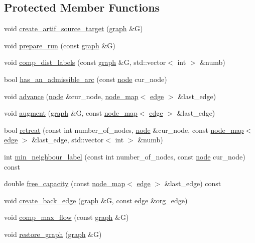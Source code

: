 \subsection*{Protected Member Functions}
\begin{DoxyCompactItemize}
\item 
void \mbox{\hyperlink{classmaxflow__sap_a617016b94a4924fb2574ab87c970d49c}{create\+\_\+artif\+\_\+source\+\_\+target}} (\mbox{\hyperlink{classgraph}{graph}} \&G)
\item 
void \mbox{\hyperlink{classmaxflow__sap_a4504b071456d536371ff6d07055e800d}{prepare\+\_\+run}} (const \mbox{\hyperlink{classgraph}{graph}} \&G)
\item 
void \mbox{\hyperlink{classmaxflow__sap_ab9a8d9e4e32a8eb6390c0d2fb3cb9596}{comp\+\_\+dist\+\_\+labels}} (const \mbox{\hyperlink{classgraph}{graph}} \&G, std\+::vector$<$ int $>$ \&numb)
\item 
bool \mbox{\hyperlink{classmaxflow__sap_a4fdfe2e37832ed2e522b5c972aa1ba5f}{has\+\_\+an\+\_\+admissible\+\_\+arc}} (const \mbox{\hyperlink{classnode}{node}} cur\+\_\+node)
\item 
void \mbox{\hyperlink{classmaxflow__sap_a0eb02b00fa0840cfad87eb6d67c9b849}{advance}} (\mbox{\hyperlink{classnode}{node}} \&cur\+\_\+node, \mbox{\hyperlink{classnode__map}{node\+\_\+map}}$<$ \mbox{\hyperlink{classedge}{edge}} $>$ \&last\+\_\+edge)
\item 
void \mbox{\hyperlink{classmaxflow__sap_a02f7814313a36b30bb99c40ead6c9ef5}{augment}} (\mbox{\hyperlink{classgraph}{graph}} \&G, const \mbox{\hyperlink{classnode__map}{node\+\_\+map}}$<$ \mbox{\hyperlink{classedge}{edge}} $>$ \&last\+\_\+edge)
\item 
bool \mbox{\hyperlink{classmaxflow__sap_a88a24204f44031d2332493474ee18f95}{retreat}} (const int number\+\_\+of\+\_\+nodes, \mbox{\hyperlink{classnode}{node}} \&cur\+\_\+node, const \mbox{\hyperlink{classnode__map}{node\+\_\+map}}$<$ \mbox{\hyperlink{classedge}{edge}} $>$ \&last\+\_\+edge, std\+::vector$<$ int $>$ \&numb)
\item 
int \mbox{\hyperlink{classmaxflow__sap_a7cf86463129a569f41883fdad6869fce}{min\+\_\+neighbour\+\_\+label}} (const int number\+\_\+of\+\_\+nodes, const \mbox{\hyperlink{classnode}{node}} cur\+\_\+node) const
\item 
double \mbox{\hyperlink{classmaxflow__sap_abd2935db387f32891228291a52d6ad45}{free\+\_\+capacity}} (const \mbox{\hyperlink{classnode__map}{node\+\_\+map}}$<$ \mbox{\hyperlink{classedge}{edge}} $>$ \&last\+\_\+edge) const
\item 
void \mbox{\hyperlink{classmaxflow__sap_a4278d120bdbc505abb176f5ca6ba02b3}{create\+\_\+back\+\_\+edge}} (\mbox{\hyperlink{classgraph}{graph}} \&G, const \mbox{\hyperlink{classedge}{edge}} \&org\+\_\+edge)
\item 
void \mbox{\hyperlink{classmaxflow__sap_ae5ff08e7b1c5fe5845a2ed584b04ca1b}{comp\+\_\+max\+\_\+flow}} (const \mbox{\hyperlink{classgraph}{graph}} \&G)
\item 
void \mbox{\hyperlink{classmaxflow__sap_ad1a311df47e4b9936ead7c306d723ed0}{restore\+\_\+graph}} (\mbox{\hyperlink{classgraph}{graph}} \&G)
\end{DoxyCompactItemize}
